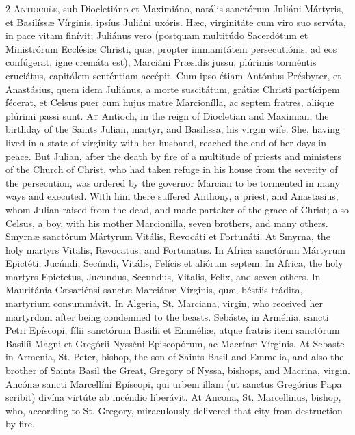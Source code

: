 \begin{paracol}{2}
\lettrine[lines=2]{A}{ntiochíæ,} sub Diocletiáno et Maximiáno, 
 natális sanctórum Juliáni Mártyris, et Basilíssæ Vírginis, ipsíus Juliáni 
 uxóris. Hæc, virginitáte cum viro suo serváta, in pace vitam finívit; 
 Juliánus vero (postquam multitúdo Sacerdótum et Ministrórum Ecclésiæ 
 Christi, quæ, propter immanitátem persecutiónis, ad eos confúgerat, igne 
 cremáta est), Marciáni Præsidis jussu, plúrimis torméntis cruciátus, 
 capitálem senténtiam accépit. Cum ipso étiam Antónius Présbyter, et Anastásius, quem idem Juliánus, a morte suscitátum, grátiæ Christi partícipem fécerat, et Celsus puer cum hujus matre Marcionílla, ac septem 
 fratres, aliíque plúrimi passi sunt.
\switchcolumn
{}
\lettrine[lines=2]{A}{t} Antioch, in the reign of Diocletian and Maximian, the birthday of the 
 Saints Julian, martyr, and Basilissa, his virgin wife. She, having 
 lived in a state of virginity with her husband, reached the end of her days 
 in peace. But Julian, after the death by fire of a multitude of 
 priests and ministers of the Church of Christ, who had taken refuge in his 
 house from the severity of the persecution, was ordered by the governor 
 Marcian to be tormented in many ways and executed. With him there 
 suffered Anthony, a priest, and Anastasius, whom Julian raised from the 
 dead, and made partaker of the grace of Christ; also Celsus, a boy, with his 
 mother Marcionilla, seven brothers, and many others.
\switchcolumn*
{}
Smyrnæ sanctórum Mártyrum Vitális, Revocáti et 
 Fortunáti.
\switchcolumn
{}
At Smyrna, the holy martyrs Vitalis, Revocatus, and Fortunatus.
\switchcolumn*
{}
In Africa sanctórum Mártyrum Epictéti, Jucúndi, 
 Secúndi, Vitális, Felícis et aliórum septem.
\switchcolumn
{}
In Africa, the holy martyrs Epictetus, Jucundus, Secundus, Vitalis, Felix, 
 and seven others.
\switchcolumn*
{}
In Mauritánia Cæsariénsi sanctæ Marciánæ 
 Vírginis, quæ, béstiis trádita, martyrium consummávit.
\switchcolumn
{}
In Algeria, St. Marciana, virgin, who received her martyrdom after being 
 condemned to the beasts.
\switchcolumn*
{}
Sebáste, in Arménia, sancti Petri Epíscopi, fílii sanctórum Basilíi 
 et Emméliæ, atque fratris item sanctórum Basilíi Magni et Gregórii Nysséni 
 Episcopórum, ac Macrínæ Vírginis.
\switchcolumn
{}
At Sebaste in Armenia, St. Peter, bishop, the son of Saints Basil and 
 Emmelia, and also the brother of Saints Basil the Great, Gregory of Nyssa, 
 bishops, and Macrina, virgin.
\switchcolumn*
{}
Ancónæ sancti Marcellíni Epíscopi, qui urbem 
 illam (ut sanctus Gregórius Papa scribit) divína virtúte ab incéndio 
 liberávit.
\switchcolumn
{}
At Ancona, St. Marcellinus, bishop, who, according to St. Gregory, 
 miraculously delivered that city from destruction by fire.
\switchcolumn*
{}
\end{paracol}


